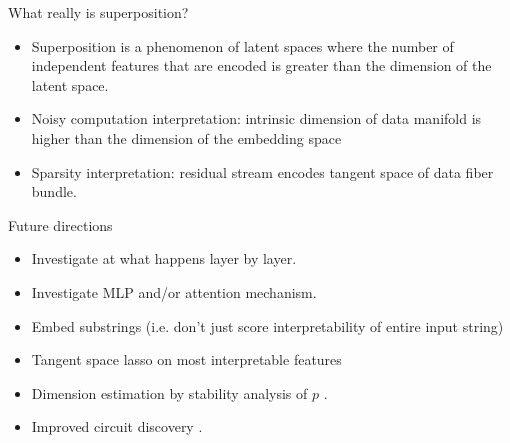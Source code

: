 \begin{frame}{What really is superposition?}
\begin{itemize}
    \item Superposition is a phenomenon of latent spaces where the number of independent features that are encoded is greater than the dimension of the latent space.
    \item Noisy computation interpretation: intrinsic dimension of data manifold is higher than the dimension of the embedding space
    \item Sparsity interpretation: residual stream encodes tangent space of data fiber bundle.
\end{itemize}
\end{frame}


\begin{frame}{Future directions}
\begin{itemize}
    \item Investigate at what happens layer by layer.
    \item Investigate MLP and/or attention mechanism.
    \item Embed substrings (i.e. don't just score interpretability of entire input string)
    \item Tangent space lasso on most interpretable features
    \item Dimension estimation by stability analysis of $p$ \citep{Robert-AIZI-undated-qg}.
    \item Improved circuit discovery \citep{Bricken-undated-zm}.
\end{itemize}
\end{frame}